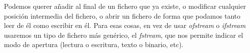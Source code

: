 \documentclass[a4paper,12pt]{article}
\begin{document}
\noindent {}\par


\noindent \hspace*{0.49in}\par


\noindent \hspace*{0.49in}\par


\noindent \hspace*{0.49in}{\fontsize{10pt}{10pt}\selectfont $ \} $}\par


\noindent {}\par


\noindent {\fontsize{10pt}{10pt}\selectfont $ \} $}\par

\begin{adjustwidth}{0.49in}{0.0in}
\begin{justify}
Podemos querer añadir al final de un fichero que ya existe, o modificar cualquier posición intermedia del fichero, o abrir un fichero de forma que podamos tanto leer de él como escribir en él. Para esas cosas, en vez de usar \textit{ofstream} o \textit{ifstream} usaremos un tipo de fichero más genérico, el \textit{fstream}, que nos permite indicar el modo de apertura (lectura o escritura, texto o binario, etc).
\end{justify}\par

\end{adjustwidth}


\par


\par


\noindent {}\par
\end{document}
